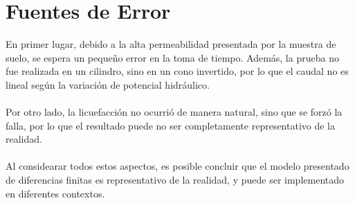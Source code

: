 \section{Fuentes de Error}

En primer lugar, debido a la alta permeabilidad presentada por la muestra de suelo, se espera un pequeño error en la toma de tiempo. Además, la prueba no fue realizada en un cilindro, sino en un cono invertido, por lo que el caudal no es lineal según la variación de potencial hidráulico.
\\ \\
Por otro lado, la licuefacción no ocurrió de manera natural, sino que se forzó la falla, por lo que el resultado puede no ser completamente representativo de la realidad.
\\ \\
Al considearar todos estos aspectos, es posible concluir que el modelo presentado de diferencias finitas es representativo de la realidad, y puede ser implementado en diferentes contextos.
